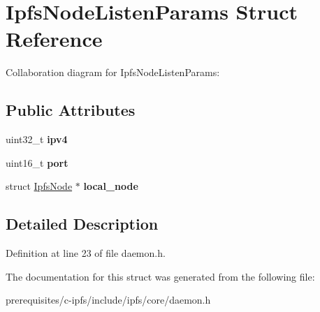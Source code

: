 \hypertarget{struct_ipfs_node_listen_params}{}\section{Ipfs\+Node\+Listen\+Params Struct Reference}
\label{struct_ipfs_node_listen_params}


Collaboration diagram for Ipfs\+Node\+Listen\+Params\+:
\subsection*{Public Attributes}
\begin{DoxyCompactItemize}
\item 
\mbox{\label{struct_ipfs_node_listen_params_a8b55bb0f84eb273ebff08b51f198b9fe}} 
uint32\+\_\+t {\bfseries ipv4}
\item 
\mbox{\label{struct_ipfs_node_listen_params_a221be426e8a3e700dc5edb5c91e8980f}} 
uint16\+\_\+t {\bfseries port}
\item 
\mbox{\label{struct_ipfs_node_listen_params_aee7523c50f1b4eaade5ad486911df281}} 
struct \mbox{\hyperlink{struct_ipfs_node}{Ipfs\+Node}} $\ast$ {\bfseries local\+\_\+node}
\end{DoxyCompactItemize}


\subsection{Detailed Description}


Definition at line 23 of file daemon.\+h.



The documentation for this struct was generated from the following file\+:\begin{DoxyCompactItemize}
\item 
prerequisites/c-\/ipfs/include/ipfs/core/daemon.\+h\end{DoxyCompactItemize}
